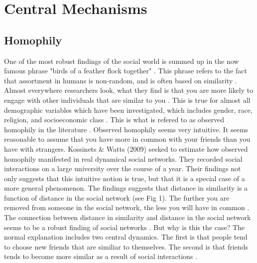 \documentclass{article}
\begin{document}
\section{Central Mechanisms}
\subsection{Homophily}
One of the most robust findings of the social world is summed up in the now famous phrase "birds of a feather flock together" \cite{mcpherson_birds_2001}. This phrase refers to the fact that assortment in humans is non-random, and is often based on similarity \cite{asikainen_cumulative_2020,crandall_feedback_2008,mcpherson_birds_2001}. Almost everywhere researchers look, what they find is that you are more likely to engage with other individuals that are similar to you \cite{taylor_exploring_2018}. This is true for almost all demographic variables which have been investigated, which includes gender, race, religion, and socioeconomic class \cite{asikainen_cumulative_2020,mcpherson_birds_2001}. 
This is what is refered to as observed homophily in the literature \cite{kossinets_origins_2009,mcpherson_birds_2001}. Observed homophily seems very intuitive. It seems reasonable to assume that you have more in common with your friends than you have with strangers. 
Kossinets \& Watts (2009) seeked to estimate how observed homophily manifested in real dynamical social networks. They recorded social interactions on a large university over the course of a year. Their findings not only suggests that this intuitive notion is true, but that it is a special case of a more general phenomenon. The findings suggests that distance in similarity is a function of distance in the social network (see Fig 1). The further you are removed from someone in the social network, the less you will have in common \cite{kossinets_origins_2009}. The connection between distance in similarity and distance in the social network seems to be a robust finding of social networks \cite{bener_empirical_2016,crandall_feedback_2008}.
But why is this the case? The normal explanation includes two central dynamics. The first is that people tend to choose new friends that are similiar to themselves. The second is that friends tends to become more similar as a result of social interactions \cite{crandall_feedback_2008}. 
\end{document}
